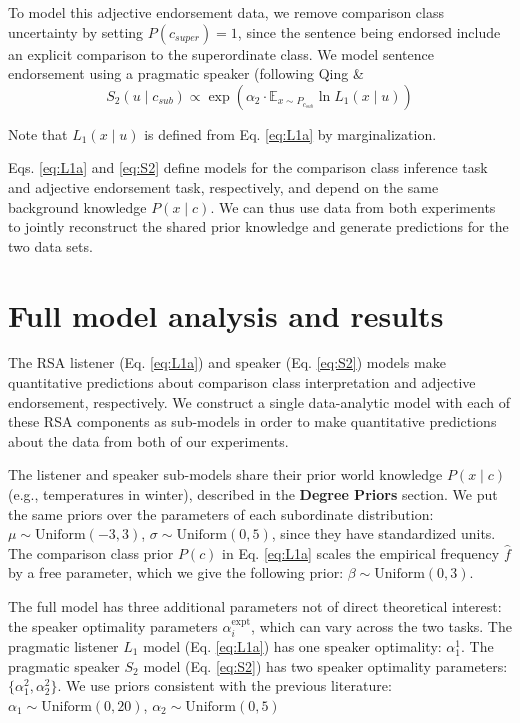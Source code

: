 \documentclass[doc]{apa6}
\begin{document}
To model this adjective endorsement data, we remove comparison class
uncertainty by setting \(P(c_{super}) = 1\), since the sentence being
endorsed include an explicit comparison to the superordinate class. We
model sentence endorsement using a pragmatic speaker (following Qing \&
\begin{equation}
S_{2}(u \mid c_{sub}) \propto \exp{(\alpha_2 \cdot {\mathbb E}_{x\sim P_{c_{sub}}} \ln{L_1(x \mid u)})} \label{eq:S2a}
\end{equation} 



\noindent Note that $L_1(x \mid u)$ is defined from Eq.
\ref{eq:L1a} by marginalization.

Eqs. \ref{eq:L1a} and \ref{eq:S2} define models for the comparison class
inference task and adjective endorsement task, respectively, and depend
on the same background knowledge \(P(x\mid c)\). We can thus use data
from both experiments to jointly reconstruct the shared prior knowledge
and generate predictions for the two data sets.


\section{Full model analysis and
results}

The RSA listener (Eq. \ref{eq:L1a}) and speaker (Eq. \ref{eq:S2}) models
make quantitative predictions about comparison class interpretation and
adjective endorsement, respectively. We construct a single data-analytic
model with each of these RSA components as sub-models in order to make
quantitative predictions about the data from both of our experiments.

The listener and speaker sub-models share their prior world knowledge
\(P(x \mid c)\) (e.g., temperatures in winter), described in the
\textbf{Degree Priors} section. We put the same priors over the
parameters of each subordinate distribution:
\(\mu \sim \text{Uniform}(-3, 3)\),
\(\sigma \sim \text{Uniform}(0, 5)\), since they have standardized
units. The comparison class prior \(P(c)\) in Eq. \ref{eq:L1a} scales
the empirical frequency \(\hat{f}\) by a free parameter, which we give
the following prior: \(\beta \sim \text{Uniform}(0, 3)\).

The full model has three additional parameters not of direct theoretical
interest: the speaker optimality parameters \(\alpha^\text{expt}_{i}\),
which can vary across the two tasks. The pragmatic listener \(L_1\)
model (Eq. \ref{eq:L1a}) has one speaker optimality:
\(\alpha^\text{1}_{1}\). The pragmatic speaker \(S_2\) model (Eq.
\ref{eq:S2}) has two speaker optimality parameters:
\(\{\alpha^\text{2}_{1}, \alpha^\text{2}_{2}\}\). We use priors
consistent with the previous literature:
\(\alpha_1 \sim \text{Uniform}(0, 20)\),
\(\alpha_2 \sim \text{Uniform}(0, 5)\)
\end{document}
